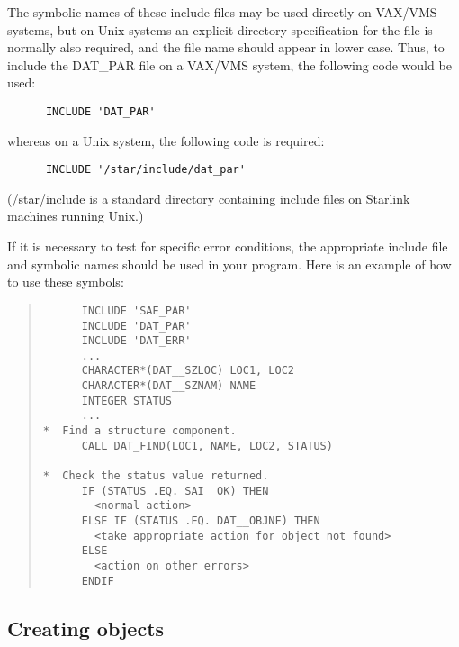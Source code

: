 The symbolic names of these include files may be used directly on VAX/VMS
systems, but on Unix systems an explicit directory specification for the file
is normally also required, and the file name should appear in lower case.
Thus, to include the DAT\_PAR file on a VAX/VMS system, the following code
would be used:

\begin{small}
\begin{verbatim}
      INCLUDE 'DAT_PAR'
\end{verbatim}
\end{small}

whereas on a Unix system, the following code is required:

\begin{small}
\begin{verbatim}
      INCLUDE '/star/include/dat_par'
\end{verbatim}
\end{small}

(/star/include is a standard directory containing include files on Starlink
machines running Unix.)

If it is necessary to test for specific error conditions, the appropriate
include file and symbolic names should be used in your program.
Here is an example of how to use these symbols:

\begin{quote}

\begin{small}
\begin{verbatim}
      INCLUDE 'SAE_PAR'
      INCLUDE 'DAT_PAR'
      INCLUDE 'DAT_ERR'
      ...
      CHARACTER*(DAT__SZLOC) LOC1, LOC2
      CHARACTER*(DAT__SZNAM) NAME
      INTEGER STATUS
      ...
*  Find a structure component.
      CALL DAT_FIND(LOC1, NAME, LOC2, STATUS)

*  Check the status value returned.
      IF (STATUS .EQ. SAI__OK) THEN
        <normal action>
      ELSE IF (STATUS .EQ. DAT__OBJNF) THEN
        <take appropriate action for object not found>
      ELSE
        <action on other errors>
      ENDIF
\end{verbatim}
\end{small}

\end{quote}

\subsection{Creating objects}
\label{S_creating}

